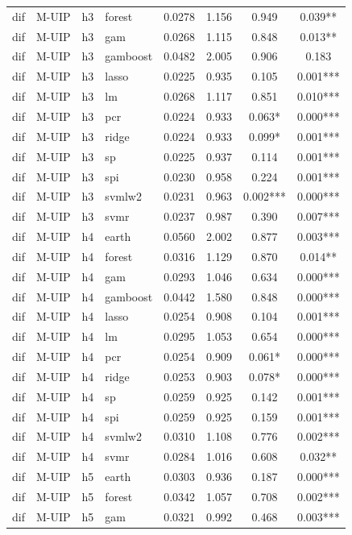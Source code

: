 \begin{ThreePartTable}
\begin{longtable}[t]{llclcccc}
dif & M-UIP & h3 & forest & 0.0278 & 1.156 & 0.949 & 0.039**\\
dif & M-UIP & h3 & gam & 0.0268 & 1.115 & 0.848 & 0.013**\\
dif & M-UIP & h3 & gamboost & 0.0482 & 2.005 & 0.906 & 0.183\\
dif & M-UIP & h3 & lasso & 0.0225 & 0.935 & 0.105 & 0.001***\\
dif & M-UIP & h3 & lm & 0.0268 & 1.117 & 0.851 & 0.010***\\
dif & M-UIP & h3 & pcr & 0.0224 & 0.933 & 0.063* & 0.000***\\
dif & M-UIP & h3 & ridge & 0.0224 & 0.933 & 0.099* & 0.001***\\
dif & M-UIP & h3 & sp & 0.0225 & 0.937 & 0.114 & 0.001***\\
dif & M-UIP & h3 & spi & 0.0230 & 0.958 & 0.224 & 0.001***\\
dif & M-UIP & h3 & svmlw2 & 0.0231 & 0.963 & 0.002*** & 0.000***\\
dif & M-UIP & h3 & svmr & 0.0237 & 0.987 & 0.390 & 0.007***\\
\addlinespace
dif & M-UIP & h4 & earth & 0.0560 & 2.002 & 0.877 & 0.003***\\
dif & M-UIP & h4 & forest & 0.0316 & 1.129 & 0.870 & 0.014**\\
dif & M-UIP & h4 & gam & 0.0293 & 1.046 & 0.634 & 0.000***\\
dif & M-UIP & h4 & gamboost & 0.0442 & 1.580 & 0.848 & 0.000***\\
dif & M-UIP & h4 & lasso & 0.0254 & 0.908 & 0.104 & 0.001***\\
dif & M-UIP & h4 & lm & 0.0295 & 1.053 & 0.654 & 0.000***\\
dif & M-UIP & h4 & pcr & 0.0254 & 0.909 & 0.061* & 0.000***\\
dif & M-UIP & h4 & ridge & 0.0253 & 0.903 & 0.078* & 0.000***\\
dif & M-UIP & h4 & sp & 0.0259 & 0.925 & 0.142 & 0.001***\\
dif & M-UIP & h4 & spi & 0.0259 & 0.925 & 0.159 & 0.001***\\
dif & M-UIP & h4 & svmlw2 & 0.0310 & 1.108 & 0.776 & 0.002***\\
dif & M-UIP & h4 & svmr & 0.0284 & 1.016 & 0.608 & 0.032**\\
\addlinespace
dif & M-UIP & h5 & earth & 0.0303 & 0.936 & 0.187 & 0.000***\\
dif & M-UIP & h5 & forest & 0.0342 & 1.057 & 0.708 & 0.002***\\
dif & M-UIP & h5 & gam & 0.0321 & 0.992 & 0.468 & 0.003***\\

\end{longtable}
\end{ThreePartTable}
